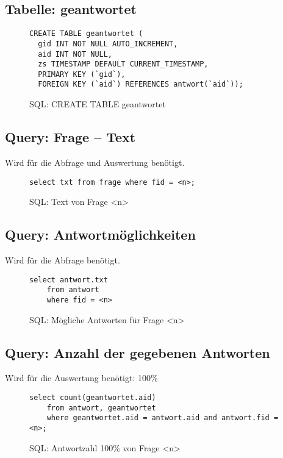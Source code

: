 \subsection{Tabelle: geantwortet}
\begin{figure}[h]
\begin{verbatim}
CREATE TABLE geantwortet (
  gid INT NOT NULL AUTO_INCREMENT,
  aid INT NOT NULL,
  zs TIMESTAMP DEFAULT CURRENT_TIMESTAMP,
  PRIMARY KEY (`gid`),
  FOREIGN KEY (`aid`) REFERENCES antwort(`aid`));
\end{verbatim}
\caption{SQL: CREATE TABLE geantwortet}
\label{sql:tblgeantwortet}
\end{figure}

\subsection{Query: Frage -- Text}
Wird für die Abfrage und Auswertung benötigt.

\begin{figure}[h]
\begin{verbatim}
select txt from frage where fid = <n>;
\end{verbatim}
\caption{SQL: Text von Frage <n>}
\label{sql:qfragetxt}
\end{figure}

\subsection{Query: Antwortmöglichkeiten}
Wird für die Abfrage benötigt.

\begin{figure}[h]
\begin{verbatim}
select antwort.txt
	from antwort
	where fid = <n> 
\end{verbatim}
\caption{SQL: Mögliche Antworten für Frage <n>}
\label{sql:qantwnum}
\end{figure}


\subsection{Query: Anzahl der gegebenen Antworten}
Wird für die Auswertung benötigt: 100\%

\begin{figure}[h]
\begin{verbatim}
select count(geantwortet.aid) 
	from antwort, geantwortet 
	where geantwortet.aid = antwort.aid and antwort.fid = <n>;
\end{verbatim}
\caption{SQL: Antwortzahl 100\% von Frage <n>}
\label{sql:qantw100}
\end{figure}


